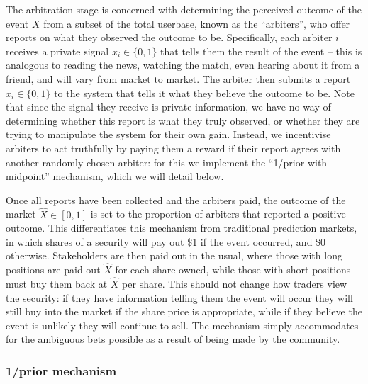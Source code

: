 The arbitration stage is concerned with determining the perceived outcome
of the event $X$ from a subset of the total userbase, known as the
``arbiters'', who offer reports on what they observed the outcome to be.
Specifically, each arbiter $i$ receives a private signal $x_i \in \{0,1\}$ that
tells them the result of the event -- this is analogous to reading the news,
watching the match, even hearing about it from a friend, and will vary from
market to market. The arbiter then submits a report $\hat{x}_i \in \{0,1\}$ to
the system that tells it what they believe the outcome to be. Note that since
the signal they receive is private information, we have no way of determining
whether this report is what they truly observed, or whether they are trying to
manipulate the system for their own gain. Instead, we incentivise arbiters to
act truthfully by paying them a reward if their report agrees with another
randomly chosen arbiter: for this we implement the ``1/prior with midpoint''
mechanism, which we will detail below.

Once all reports have been collected and the arbiters paid, the outcome of the
market $\hat{X} \in [0,1]$ is set to the proportion of arbiters that reported a
positive outcome. This differentiates this mechanism from traditional
prediction markets, in which shares of a security will pay out \$1 if the event
occurred, and \$0 otherwise. Stakeholders are then paid out in the usual, where
those with long positions are paid out $\hat{X}$ for each share owned, while
those with short positions must buy them back at $\hat{X}$ per share. This
should not change how traders view the security: if they have information
telling them the event will occur they will still buy into the market if the
share price is appropriate, while if they believe the event is unlikely they
will continue to sell. The mechanism simply accommodates for the ambiguous bets
possible as a result of being made by the community.

\subsubsection{1/prior mechanism}

